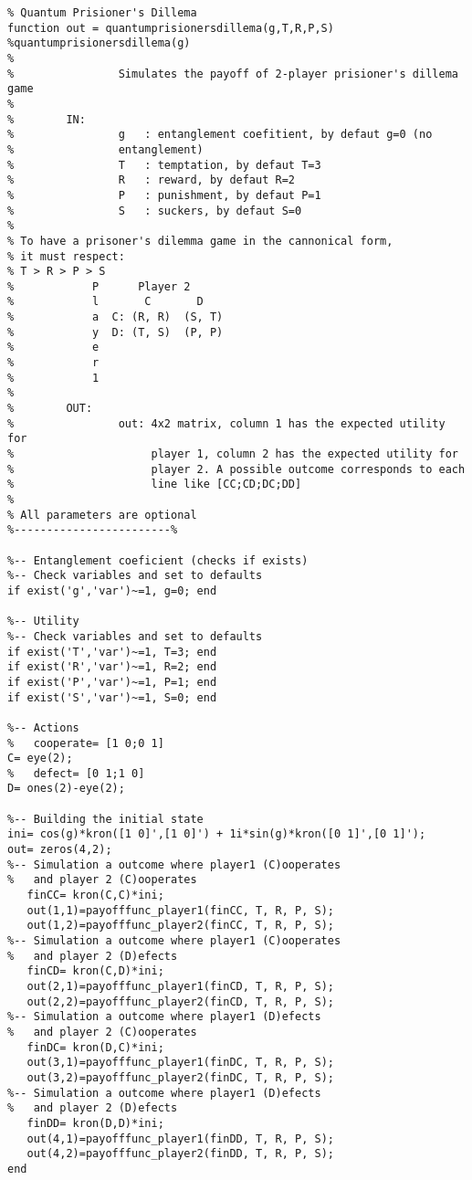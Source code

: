 \label{ap:b}


\begin{lstlisting}
% Quantum Prisioner's Dillema
function out = quantumprisionersdillema(g,T,R,P,S)
%quantumprisionersdillema(g)
%   
%                Simulates the payoff of 2-player prisioner's dillema game
%                 
%        IN:
%                g   : entanglement coefitient, by defaut g=0 (no
%                entanglement)
%                T   : temptation, by defaut T=3
%                R   : reward, by defaut R=2
%                P   : punishment, by defaut P=1
%                S   : suckers, by defaut S=0
%
% To have a prisoner's dilemma game in the cannonical form, 
% it must respect:
% T > R > P > S
%            P      Player 2
%            l       C       D
%            a  C: (R, R)  (S, T)
%            y  D: (T, S)  (P, P)
%            e
%            r
%            1
%
%        OUT:    
%                out: 4x2 matrix, column 1 has the expected utility for
%                     player 1, column 2 has the expected utility for
%                     player 2. A possible outcome corresponds to each
%                     line like [CC;CD;DC;DD]
%                     
% All parameters are optional
%------------------------%

%-- Entanglement coeficient (checks if exists)
%-- Check variables and set to defaults
if exist('g','var')~=1, g=0; end

%-- Utility
%-- Check variables and set to defaults
if exist('T','var')~=1, T=3; end
if exist('R','var')~=1, R=2; end
if exist('P','var')~=1, P=1; end
if exist('S','var')~=1, S=0; end

%-- Actions
%   cooperate= [1 0;0 1]
C= eye(2);
%   defect= [0 1;1 0]
D= ones(2)-eye(2);

%-- Building the initial state
ini= cos(g)*kron([1 0]',[1 0]') + 1i*sin(g)*kron([0 1]',[0 1]');
out= zeros(4,2);   
%-- Simulation a outcome where player1 (C)ooperates 
%   and player 2 (C)ooperates
   finCC= kron(C,C)*ini;
   out(1,1)=payofffunc_player1(finCC, T, R, P, S);
   out(1,2)=payofffunc_player2(finCC, T, R, P, S);
%-- Simulation a outcome where player1 (C)ooperates 
%   and player 2 (D)efects
   finCD= kron(C,D)*ini;
   out(2,1)=payofffunc_player1(finCD, T, R, P, S);
   out(2,2)=payofffunc_player2(finCD, T, R, P, S);
%-- Simulation a outcome where player1 (D)efects
%   and player 2 (C)ooperates
   finDC= kron(D,C)*ini;
   out(3,1)=payofffunc_player1(finDC, T, R, P, S);
   out(3,2)=payofffunc_player2(finDC, T, R, P, S);
%-- Simulation a outcome where player1 (D)efects
%   and player 2 (D)efects
   finDD= kron(D,D)*ini;
   out(4,1)=payofffunc_player1(finDD, T, R, P, S);
   out(4,2)=payofffunc_player2(finDD, T, R, P, S);
end


\end{lstlisting}
